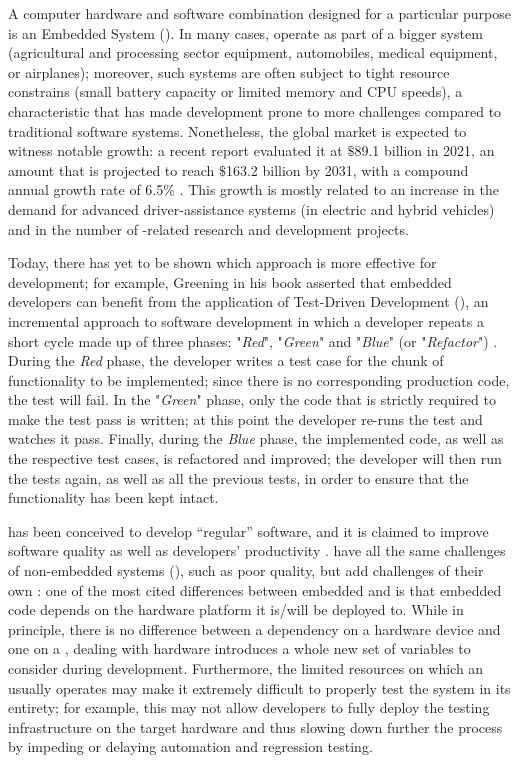 A computer hardware and software combination designed for a particular purpose is an Embedded System (\es). In many cases, \ess operate as part of a bigger system (\eg  agricultural and processing sector equipment, automobiles, medical equipment, or airplanes); moreover, such systems are often subject to tight resource constrains (\eg small battery capacity or limited memory and CPU speeds), a characteristic that has made \es development prone to more challenges compared to traditional software systems.
Nonetheless, the global \ess market is expected to witness notable growth: a recent report evaluated it at $\$$89.1 billion in 2021, an amount that is projected to reach $\$$163.2 billion by 2031, with a compound annual growth rate of 6.5\% \cite{ESSTR2022}. This growth is mostly related to an increase in the demand for advanced driver-assistance systems (in electric and hybrid vehicles) and in the number of \ess-related research and development projects.  

Today, there has yet to be shown which approach is more effective for \ess development; for example, Greening \cite{TDDEC} in his book asserted that embedded developers can benefit from the application of Test-Driven Development (\tdd), an incremental approach to software development in which a developer repeats a short cycle made up of three phases: "\textit{Red}", "\textit{Green}" and "\textit{Blue}" (or "\textit{Refactor}") \cite{TDDByExample}. 
During the \textit{Red} phase, the developer writes a test case for the chunk of functionality to be implemented; since there is no corresponding production code, the test will fail. 
In the "\textit{Green}" phase, only the code that is strictly required to make the test pass is written; at this point the developer re-runs the test and watches it pass.
Finally, during the \textit{Blue} phase, the implemented code, as well as the respective test cases, is refactored and improved; the developer will then run the tests again, as well as all the previous tests, in order to ensure that the functionality has been kept intact.

\tdd has been conceived to develop “regular” software, and it is claimed to improve software quality as well as developers' productivity \cite{DBLP:reference/se/ErdogmusMJ10}. \ess have all the same challenges of non-embedded systems (\noess), such as poor quality, but add challenges of their own \cite{TDDEC}: one of the most cited differences between embedded and \noess is that embedded code depends on the hardware platform it is/will be deployed to. 
While in principle, there is no difference between a dependency on a hardware device and one on a \noess \cite{TDDEC}, dealing with hardware introduces a whole new set of variables to consider during development. Furthermore, the limited resources on which an \es usually operates may make it extremely difficult to properly test the system in its entirety; for example, this may not allow developers to fully deploy the testing infrastructure on the target hardware and thus slowing down further the process by impeding or delaying automation and regression testing.

